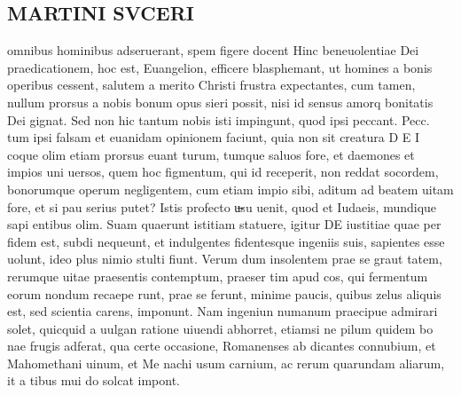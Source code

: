 \documentclass{article}
\begin{document}
\begin{pages}
\section*{MARTINI SVCERI }\pstart omnibus hominibus adseruerant, spem figere docent Hinc beneuolentiae Dei praedicationem, hoc est, Euangelion, efficere blasphemant, ut homines a bonis operibus cessent, salutem a merito Christi frustra expectantes, cum tamen, nullum prorsus a nobis bonum opus sieri possit, nisi id sensus amorq bonitatis Dei gignat. Sed non hic tantum nobis isti impingunt, quod ipsi peccant.  Pecc. tum ipsi falsam et euanidam opinionem faciunt, quia non sit creatura D E I coque olim etiam prorsus euant turum, tumque saluos fore, et daemones et impios uni uersos, quem hoc figmentum, qui id receperit, non reddat socordem, bonorumque operum negligentem, cum etiam impio sibi, aditum ad beatem uitam fore, et si pau serius putet?  \pend\pstart Istis profecto u̶su uenit, quod et Iudaeis, mundique sapi entibus olim. Suam quaerunt istitiam statuere, igitur DE iustitiae quae per fidem est, subdi nequeunt, et indulgentes fidentesque ingeniis suis, sapientes esse uolunt, ideo plus nimio stulti fiunt. Verum dum insolentem prae se graut tatem, rerumque uitae praesentis contemptum, praeser tim apud cos, qui fermentum eorum nondum recaepe runt, prae se ferunt, minime paucis, quibus zelus aliquis est, sed scientia carens, imponunt. Nam ingeniun numanum praecipue admirari solet, quicquid a uulgan ratione uiuendi abhorret, etiamsi ne pilum quidem bo nae frugis adferat, qua certe occasione, Romanenses ab dicantes connubium, et Mahomethani uinum, et Me nachi usum carnium, ac rerum quarundam aliarum, it  \pendQuibus   a tibus mui do solcat impont.  

\end{pages}
\end{document}

